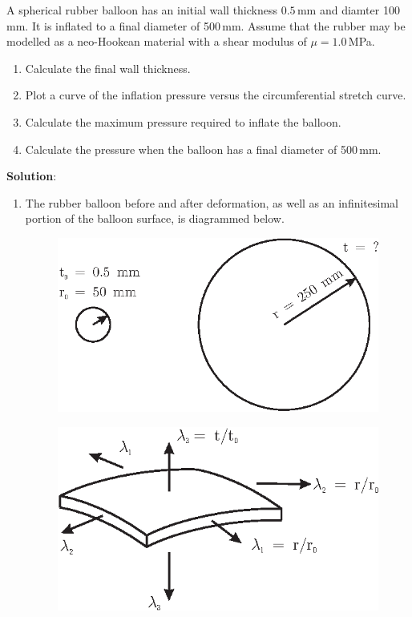 \documentclass[11pt]{article}
\newcommand{\solution}{{\bf Solution}:\\}
\begin{document}
\noindent 
A spherical rubber balloon has an initial wall thickness
$0.5$\,mm and diamter 100\,mm. It is inflated to a final diameter of
500\,mm. Assume that the rubber may  be modelled as a neo-Hookean
material with a shear modulus of $\mu=1.0$\,MPa.
\begin{enumerate}
\item Calculate the final wall thickness.
\item Plot  a curve of the inflation pressure versus the
circumferential stretch curve.
\item Calculate the maximum pressure
required to inflate  the balloon.
\item Calculate the pressure when the balloon has a final diameter of
500\,mm.
\end{enumerate}

\solution
\begin{enumerate}
\item The rubber balloon before and after deformation, as well as
an infinitesimal portion of the balloon surface, is diagrammed
below.
\begin{figure}[h]
\centering
\includegraphics{balloon_soln_a.eps}
\end{figure}
\begin{figure}[h]
\centering
\includegraphics{balloon_soln_b.eps}
\end{figure}


\end{enumerate}
\end{document}
